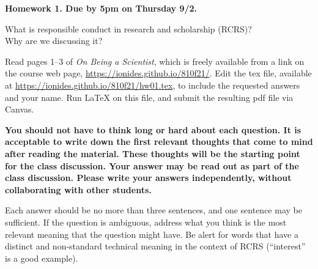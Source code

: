 \documentclass[12pt]{article}
\begin{document}
\begin{center}\bf 
Homework 1. Due by 5pm on Thursday 9/2.

What is responsible conduct in research and scholarship (RCRS)? \\
Why are we discussing it? 
\end{center}

Read pages 1--3 of {\em On Being a Scientist}, which is freely available from a link on the course web page, \url{https://ionides.github.io/810f21/}. Edit the tex file, available at \url{https://ionides.github.io/810f21/hw01.tex}, to include the requested answers and your name. Run {\LaTeX} on this file, and submit the resulting pdf file via Canvas.

{\bf You should not have to think long or hard about each question. It is acceptable to write down the first relevant thoughts that come to mind after reading the material. These thoughts will be the starting point for the class discussion. Your answer may be read out as part of the class discussion. Please write your answers independently, without collaborating with other students.

Each answer should be no more than three sentences, and one sentence may be sufficient. If the question is ambiguous, address what you think is the most relevant meaning that the question might have. Be alert for words that have a distinct and non-standard technical meaning in the context of RCRS (``interest'' is a good example).

}
\end{document}
